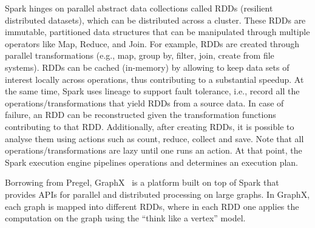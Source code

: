 Spark hinges on parallel abstract data collections called RDDs (resilient distributed datasets), which can be distributed across a cluster. These RDDs are immutable, partitioned data structures that can be manipulated through multiple operators like Map, Reduce, and Join. For example, RDDs are created through parallel transformations (e.g., map, group by, filter, join, create from file systems). RDDs can be cached (in-memory) by allowing to keep data sets of interest locally across operations, thus contributing to a substantial speedup. At the same time, Spark uses lineage to support fault tolerance, i.e., record all the operations/transformations that yield RDDs from a source data. In case of failure, an RDD can be reconstructed given the transformation functions contributing to that RDD. Additionally, after creating RDDs, it is possible to analyse them using actions such as count, reduce, collect and save. Note that all operations/transformations are lazy until one runs an action. At that point, the Spark execution engine pipelines operations and determines an execution plan.

Borrowing from Pregel, GraphX~\cite{graphx} is a platform built on top of Spark that provides APIs for parallel and distributed processing on large graphs. In GraphX, each graph is mapped into different RDDs, where in each RDD one applies the computation on the graph using the ``think like a vertex'' model. 

